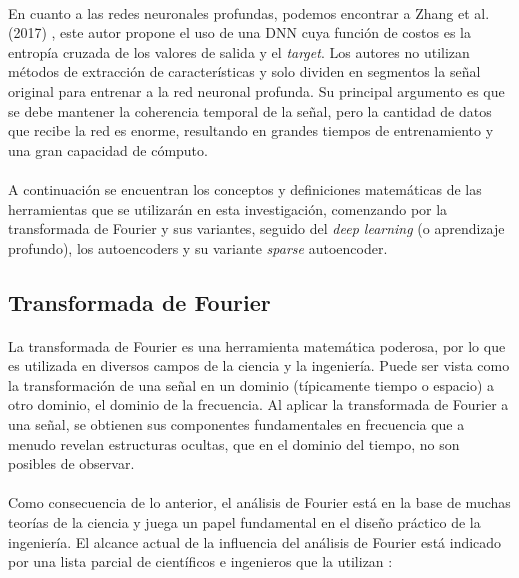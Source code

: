 \documentclass[12pt]{article}%
\begin{document}
\paragraph{}
En cuanto a las redes neuronales profundas, podemos encontrar a Zhang et al. (2017) \cite{ran}, este autor  propone el uso de una DNN cuya función de costos es la entropía cruzada de los valores de salida y el \textit{target}. Los autores no utilizan métodos de extracción de características y solo dividen en segmentos la señal original para entrenar a la red neuronal profunda. Su principal argumento es que se debe mantener la coherencia temporal de la señal, pero la cantidad de datos que recibe la red es enorme, resultando en grandes tiempos de entrenamiento y una gran capacidad de cómputo.

\paragraph{}
A continuación se encuentran los conceptos y definiciones matemáticas de las herramientas que se utilizarán en esta investigación, comenzando por la transformada de Fourier y sus variantes, seguido del \textit{deep learning} (o aprendizaje profundo), los autoencoders y su variante \textit{sparse} autoencoder.

\subsection{Transformada de Fourier}
\paragraph{}
La transformada de Fourier es una herramienta matemática poderosa, por lo que es utilizada en diversos campos de la ciencia y la ingeniería. Puede ser vista como la transformación de una señal en un dominio (típicamente tiempo o espacio) a otro dominio, el dominio de la frecuencia. Al aplicar la transformada de Fourier a una señal, se obtienen sus componentes fundamentales en frecuencia que a menudo revelan estructuras ocultas, que en el dominio del tiempo, no son posibles de observar.

\paragraph{}
Como consecuencia de lo anterior, el análisis de Fourier está en la base de muchas teorías de la ciencia y juega un papel fundamental en el diseño práctico de la ingeniería. El alcance actual de la influencia del análisis de Fourier está indicado por una lista parcial de científicos e ingenieros que la utilizan \cite{robert}:
\end{document}
